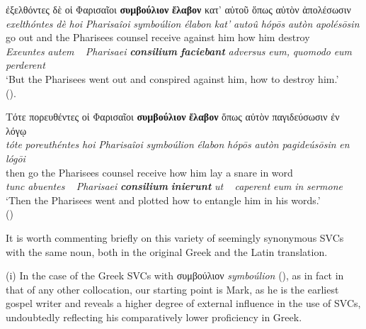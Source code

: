 \documentclass[output=paper,colorlinks,citecolor=brown]{langscibook}
\begin{document}
\z

\ea\label{ex:bj:19}

\gllll ἐξελθόντες δὲ οἱ Φαρισαῖοι \textbf{συμβούλιον} \textbf{ἔλαβον} κατ' αὐτοῦ ὅπως αὐτὸν ἀπολέσωσιν\\
  \textit{exelthóntes} \textit{dè} \textit{hoi} \textit{Pharisaîoi} \textit{symboúlion} \textit{élabon} \textit{kat'} \textit{autoû} \textit{hópōs} \textit{autòn} \textit{apolésōsin}\\
{go out} and the Pharisees counsel receive against him how him destroy\\
\emph{Exeuntes} \emph{autem} ~ \emph{Pharisaei} \textbf{\itshape consilium} \textbf{\itshape
  faciebant} \emph{adversus} \emph{eum,} \emph{quomodo} \emph{eum} \emph{perderent}\\
\glt `But the Pharisees went out and conspired against him, how to destroy him.' \\
\hspace*{\fill}().

\z

\ea\label{ex:bj:20}

\gllll Τότε πορευθέντες οἱ Φαρισαῖοι \textbf{συμβούλιον} \textbf{ἔλαβον} ὅπως αὐτὸν παγιδεύσωσιν ἐν λόγῳ\\
 \textit{tóte} \textit{poreuthéntes} \textit{hoi} \textit{Pharisaîoi} \textit{symboúlion} \textit{élabon} \textit{hópōs} \textit{autòn} \textit{pagideúsōsin} \textit{en} \textit{lógōi}\\
then go the Pharisees counsel receive how him {lay a snare} in word\\
\emph{tunc} \emph{abuentes} ~ \emph{Pharisaei} \textbf{\itshape consilium}
\textbf{\itshape inierunt} \emph{ut} ~ {\emph{caperent} \emph{eum}}  \emph{in} \emph{sermone}\\
\glt `Then the Pharisees went and plotted how to entangle him in his words.' \\
\hspace*{\fill}()

\z

It is worth commenting briefly on this variety of seemingly synonymous
SVCs with the same noun, both in the original Greek and the Latin
translation.

(i) In the case of the Greek SVCs with συμβούλιον \emph{symboúlion}
(\cite{JiménezLópez2017}), as in fact in that of any other collocation, our starting point
is Mark, as he is the earliest gospel writer and reveals a higher degree of external
influence in the use of SVCs, undoubtedly reflecting his comparatively lower proficiency
in Greek.
\end{document}
